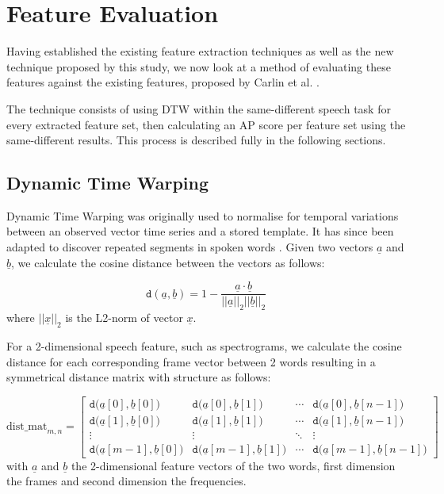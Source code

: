 \chapter{Feature Evaluation}
\label{chap:evaluation}

Having established the existing feature extraction techniques as well as the new technique proposed by this study, we now look at a method of evaluating these features against the existing features, proposed by Carlin et al. \cite{DBLP:conf/interspeech/CarlinTJH11}.

The technique consists of using DTW within the same-different speech task for every extracted feature set, then calculating an AP score per feature set using the same-different results.
This process is described fully in the following sections.

\section{Dynamic Time Warping}

Dynamic Time Warping was originally used to normalise for temporal variations between an observed vector time series and a stored template.
It has since been adapted to discover repeated segments in spoken words \cite{DBLP:conf/interspeech/CarlinTJH11}. Given two vectors $\underline{a}$ and $\underline{b}$, we calculate the cosine distance between the vectors as follows:

\begin{equation}
    \mathtt{d}(\underline{a}, \underline{b}) = 1 - \displaystyle\frac{\underline{a} \cdot \underline{b}}{{||\underline{a}||}_2 {||\underline{b}||}_2}
\end{equation}
where ${||\underline{x}||}_2$ is the L2-norm of vector $\underline{x}$.

For a 2-dimensional speech feature, such as spectrograms, we calculate the cosine distance for each corresponding frame vector between 2 words resulting in a symmetrical distance matrix with structure as follows:

\begin{equation}
    {\mathrm{dist\_mat}}_{m,n} = 
 \begin{bmatrix}
  \mathtt{d}\big(\underline{a}[0], \underline{b}[0]\big) & \mathtt{d}\big(\underline{a}[0], \underline{b}[1]\big) & \cdots & \mathtt{d}\big(\underline{a}[0], \underline{b}[n-1]\big) \\
  \mathtt{d}\big(\underline{a}[1], \underline{b}[0]\big) & \mathtt{d}\big(\underline{a}[1], \underline{b}[1]\big) & \cdots & \mathtt{d}\big(\underline{a}[1], \underline{b}[n-1]\big) \\
  \vdots  & \vdots  & \ddots & \vdots  \\
  \mathtt{d}\big(\underline{a}[m-1], \underline{b}[0]\big) & \mathtt{d}\big(\underline{a}[m-1], \underline{b}[1]\big) & \cdots & \mathtt{d}\big(\underline{a}[m-1], \underline{b}[n-1]\big)
 \end{bmatrix}
\end{equation}
with $\underline{a}$ and $\underline{b}$ the 2-dimensional feature vectors of the two words, first dimension the frames and second dimension the frequencies. 

